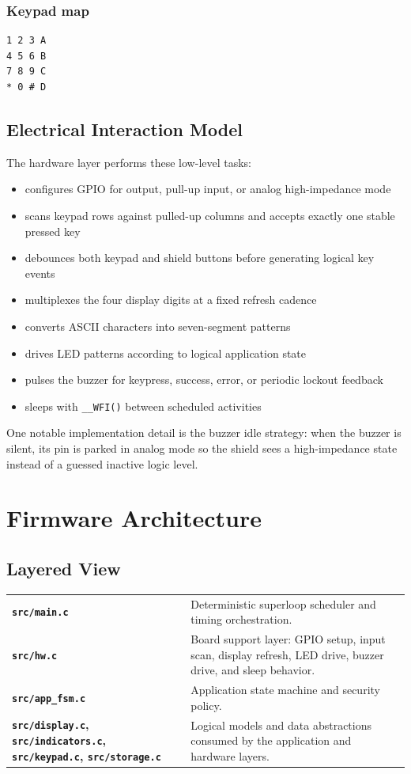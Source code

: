 \documentclass[11pt,a4paper]{article}
\begin{document}
\subsubsection*{Keypad map}

\begin{verbatim}
1 2 3 A
4 5 6 B
7 8 9 C
* 0 # D
\end{verbatim}

\subsection{Electrical Interaction Model}

The hardware layer performs these low-level tasks:

\begin{itemize}[leftmargin=1.5em]
\item configures GPIO for output, pull-up input, or analog high-impedance mode
\item scans keypad rows against pulled-up columns and accepts exactly one stable pressed key
\item debounces both keypad and shield buttons before generating logical key events
\item multiplexes the four display digits at a fixed refresh cadence
\item converts ASCII characters into seven-segment patterns
\item drives LED patterns according to logical application state
\item pulses the buzzer for keypress, success, error, or periodic lockout feedback
\item sleeps with \texttt{\_\_WFI()} between scheduled activities
\end{itemize}

One notable implementation detail is the buzzer idle strategy: when the buzzer is silent, its pin
is parked in analog mode so the shield sees a high-impedance state instead of a guessed inactive
logic level.

\section{Firmware Architecture}

\subsection{Layered View}

\begin{tabularx}{\textwidth}{>{\bfseries}l X}
\texttt{src/main.c} & Deterministic superloop scheduler and timing orchestration. \\
\texttt{src/hw.c} & Board support layer: GPIO setup, input scan, display refresh, LED drive, buzzer drive, and sleep behavior. \\
\texttt{src/app\_fsm.c} & Application state machine and security policy. \\
\texttt{src/display.c}, \texttt{src/indicators.c}, \texttt{src/keypad.c}, \texttt{src/storage.c} & Logical models and data abstractions consumed by the application and hardware layers. \\
\end{tabularx}
\end{document}
